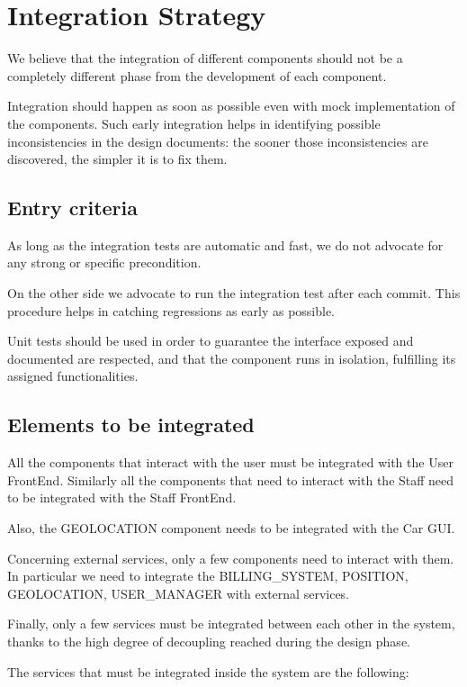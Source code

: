 \documentclass[11pt]{article} %
\begin{document}
\newpage
\section{Integration Strategy}

We believe that the integration of different components should not be a completely different phase from the development of each component.

Integration should happen as soon as possible even with mock implementation of the components. Such early integration helps in identifying possible inconsistencies in the design documents: the sooner those inconsistencies are discovered, the simpler it is to fix them.

\subsection{Entry criteria}

As long as the integration tests are automatic and fast, we do not advocate for any strong or specific precondition.

On the other side we advocate to run the integration test after each commit. This procedure helps in catching regressions as early as possible.

Unit tests should be used in order to guarantee the interface exposed and documented are respected, and that the component runs in isolation, fulfilling its assigned functionalities.

\subsection{Elements to be integrated}

All the components that interact with the user must be integrated with the User FrontEnd. Similarly all the components that need to interact with the Staff need to be integrated with the Staff FrontEnd.

Also, the GEOLOCATION component needs to be integrated with the Car GUI.

Concerning external services, only a few components need to interact with them. In particular we need to integrate the BILLING\_SYSTEM, POSITION, GEOLOCATION, USER\_MANAGER with external services.

Finally, only a few services must be integrated between each other in the system, thanks to the high degree of decoupling reached during the design phase.

The services that must be integrated inside the system are the following:
\end{document}
